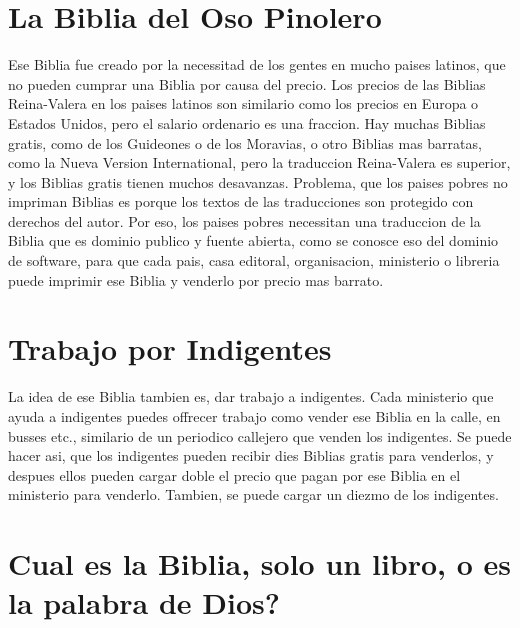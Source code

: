 \hypertarget{la-biblia-del-oso-pinolero}{%
\section{La Biblia del Oso Pinolero}\label{la-biblia-del-oso-pinolero}}

Ese Biblia fue creado por la necessitad de los gentes en mucho paises
latinos, que no pueden cumprar una Biblia por causa del precio. Los
precios de las Biblias Reina-Valera en los paises latinos son similario
como los precios en Europa o Estados Unidos, pero el salario ordenario
es una fraccion. Hay muchas Biblias gratis, como de los Guideones o de
los Moravias, o otro Biblias mas barratas, como la Nueva Version
International, pero la traduccion Reina-Valera es superior, y los
Biblias gratis tienen muchos desavanzas. Problema, que los paises pobres
no impriman Biblias es porque los textos de las traducciones son
protegido con derechos del autor. Por eso, los paises pobres necessitan
una traduccion de la Biblia que es dominio publico y fuente abierta,
como se conosce eso del dominio de software, para que cada pais, casa
editoral, organisacion, ministerio o libreria puede imprimir ese Biblia
y venderlo por precio mas barrato.

\hypertarget{trabajo-por-indigentes}{%
\section{Trabajo por Indigentes}\label{trabajo-por-indigentes}}

La idea de ese Biblia tambien es, dar trabajo a indigentes. Cada
ministerio que ayuda a indigentes puedes offrecer trabajo como vender
ese Biblia en la calle, en busses etc., similario de un periodico
callejero que venden los indigentes. Se puede hacer asi, que los
indigentes pueden recibir dies Biblias gratis para venderlos, y despues
ellos pueden cargar doble el precio que pagan por ese Biblia en el
ministerio para venderlo. Tambien, se puede cargar un diezmo de los
indigentes.

\hypertarget{cual-es-la-biblia-solo-un-libro-o-es-la-palabra-de-dios}{%
\section{Cual es la Biblia, solo un libro, o es la palabra de
Dios?}\label{cual-es-la-biblia-solo-un-libro-o-es-la-palabra-de-dios}}

